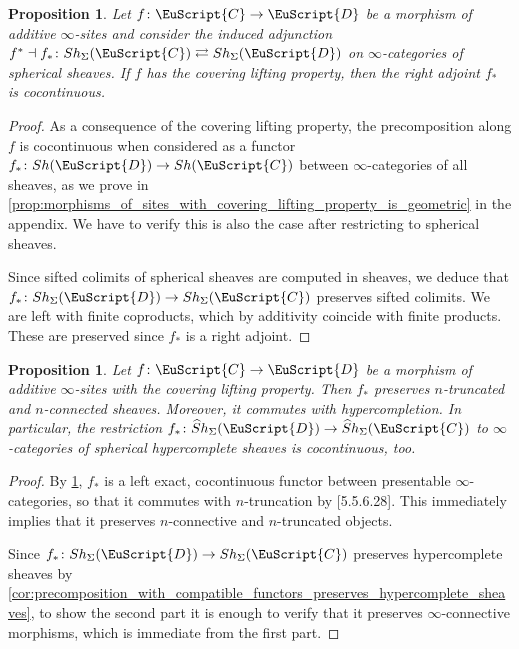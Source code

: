 \documentclass[oneside,a4paper]{amsart}
\newcommand{\euscr}[1]{\EuScript{#1}} %
\newcommand{\ccat}{\euscr{C}} %
\newcommand{\dcat}{\euscr{D}} %
\newcommand{\hpsheaves}{\widehat{S}h} %
\theoremstyle{plain}
\newtheorem{prop}[thm]{Proposition}
\theoremstyle{definition}
\theoremstyle{remark}
\begin{document}
\begin{prop}
\label{prop:additive_morphisms_induce_adjunctions_where_the_right_adjoint_is_cocontinuous}
Let $f \colon \ccat \rightarrow \dcat$ be a morphism of additive $\infty$-sites and consider the induced adjunction $f^{*} \dashv f_{*} \colon Sh_{\Sigma}(\ccat) \rightleftarrows Sh_{\Sigma}(\dcat)$ on $\infty$-categories of spherical sheaves. If $f$ has the covering lifting property, then the right adjoint $f_{*}$ is cocontinuous. 
\end{prop}

\begin{proof}
As a consequence of the covering lifting property, the precomposition along $f$ is cocontinuous when considered as a functor $f_{*} \colon Sh(\dcat) \rightarrow Sh(\ccat)$ between  $\infty$-categories of all sheaves, as we prove in \cref{prop:morphisms_of_sites_with_covering_lifting_property_is_geometric} in the appendix. We have to verify this is also the case after restricting to spherical sheaves. 

Since sifted colimits of spherical sheaves are computed in sheaves, we deduce that $f_{*} \colon Sh_{\Sigma}(\dcat) \rightarrow Sh_{\Sigma}(\ccat)$ preserves sifted colimits. We are left with finite coproducts, which by additivity coincide with finite products. These are preserved since $f_{*}$ is a right adjoint. 
\end{proof}

\begin{prop}
\label{prop:precomposition_functor_on_spherical_sheaves_preserves_connectivity_and_commutes_with_hypercompletion}
Let $f \colon \ccat \rightarrow \dcat$ be a morphism of additive $\infty$-sites with the covering lifting property. Then $f_{*}$ preserves $n$-truncated and $n$-connected sheaves. Moreover, it commutes with hypercompletion. In particular, the restriction $f_{*} \colon \hpsheaves_{\Sigma}(\dcat) \rightarrow \hpsheaves_{\Sigma}(\ccat)$ to $\infty$-categories of spherical hypercomplete sheaves is cocontinuous, too. 
\end{prop}

\begin{proof}
By \cref{prop:additive_morphisms_induce_adjunctions_where_the_right_adjoint_is_cocontinuous}, $f_{*}$ is a left exact, cocontinuous functor between presentable $\infty$-categories, so that it commutes with $n$-truncation by \cite{lurie_higher_topos_theory}[5.5.6.28]. This immediately implies that it preserves $n$-connective and $n$-truncated objects. 

Since $f_{*} \colon Sh_{\Sigma}(\dcat) \rightarrow Sh_{\Sigma}(\ccat)$ preserves hypercomplete sheaves by \cref{cor:precomposition_with_compatible_functors_preserves_hypercomplete_sheaves}, to show the second part it is enough to verify that it preserves $\infty$-connective morphisms, which is immediate from the first part.
\end{proof}
\end{document}
